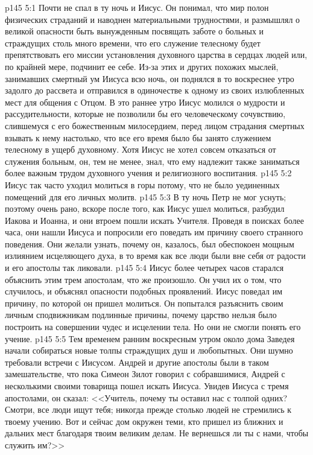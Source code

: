 \vs p145 5:1 Почти не спал в ту ночь и Иисус. Он понимал, что мир полон физических страданий и наводнен материальными трудностями, и размышлял о великой опасности быть вынужденным посвящать заботе о больных и страждущих столь много времени, что его служение телесному будет препятствовать его миссии установления духовного царства в сердцах людей или, по крайней мере, подчинит ее себе. Из\hyp{}за этих и других похожих мыслей, занимавших смертный ум Иисуса всю ночь, он поднялся в то воскреснее утро задолго до рассвета и отправился в одиночестве к одному из своих излюбленных мест для общения с Отцом. В это раннее утро Иисус молился о мудрости и рассудительности, которые не позволили бы его человеческому сочувствию, слившемуся с его божественным милосердием, перед лицом страдания смертных взывать к нему настолько, что все его время было бы занято служением телесному в ущерб духовному. Хотя Иисус не хотел совсем отказаться от служения больным, он, тем не менее, знал, что ему надлежит также заниматься более важным трудом духовного учения и религиозного воспитания.
\vs p145 5:2 Иисус так часто уходил молиться в горы потому, что не было уединенных помещений для его личных молитв.
\vs p145 5:3 В ту ночь Петр не мог уснуть; поэтому очень рано, вскоре после того, как Иисус ушел молиться, разбудил Иакова и Иоанна, и они втроем пошли искать Учителя. Проведя в поисках более часа, они нашли Иисуса и попросили его поведать им причину своего странного поведения. Они желали узнать, почему он, казалось, был обеспокоен мощным излиянием исцеляющего духа, в то время как все люди были вне себя от радости и его апостолы так ликовали.
\vs p145 5:4 Иисус более четырех часов старался объяснить этим трем апостолам, что же произошло. Он учил их о том, что случилось, и объяснял опасности подобных проявлений. Иисус поведал им причину, по которой он пришел молиться. Он попытался разъяснить своим личным сподвижникам подлинные причины, почему царство нельзя было построить на совершении чудес и исцелении тела. Но они не смогли понять его учение.
\vs p145 5:5 Тем временем ранним воскресным утром около дома Заведея начали собираться новые толпы страждущих душ и любопытных. Они шумно требовали встречи с Иисусом. Андрей и другие апостолы были в таком замешательстве, что пока Симеон Зилот говорил с собравшимися, Андрей с несколькими своими товарища пошел искать Иисуса. Увидев Иисуса с тремя апостолами, он сказал: <<Учитель, почему ты оставил нас с толпой одних? Смотри, все люди ищут тебя; никогда прежде столько людей не стремились к твоему учению. Вот и сейчас дом окружен теми, кто пришел из ближних и дальних мест благодаря твоим великим делам. Не вернешься ли ты с нами, чтобы служить им?>>
